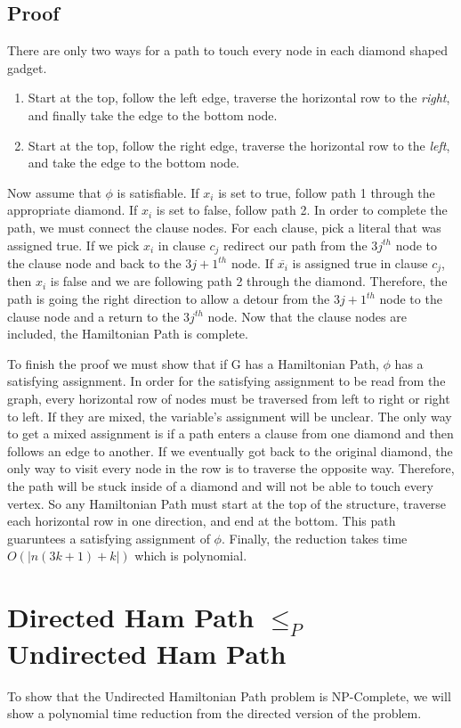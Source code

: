 \documentclass[11pt]{article}
\begin{document}
\subsection{Proof}
There are only two ways for a path to touch every node in each diamond shaped gadget. 
\begin{enumerate} 
\item {Start at the top, follow the left edge, traverse the horizontal row to
the \emph{right}, and finally take the edge to the bottom node.}
\item {Start at the top,
 follow the right edge, traverse the horizontal row to the \emph{left}, and take the 
edge to the bottom node.}
\end{enumerate}
Now assume that $\phi$ is satisfiable. If $x_{i}$ is set to true, follow path 1 through 
the appropriate diamond. If $x_{i}$ is set to false, follow path 2. In order to complete the path, we must connect the clause nodes.
For each clause, pick a literal that was assigned true. If we pick $x_{i}$ in clause
$c_{j}$ redirect our path from the $3j^{th}$ node to the clause node and back to the $3j
+1^{th}$ node. If $\overline{x_{i}}$ is assigned true in clause $c_{j}$, then $x_{i}$ is
 false and we are following path 2 through the diamond. Therefore, the path is going the
right direction to allow a detour from the $3j+1^{th}$ node to the clause node and a return to the $3j^{th}$ node. Now
 that the clause nodes are included, the Hamiltonian Path is complete.

To finish the proof we must show that if G has a Hamiltonian Path, $\phi$ has a satisfying assignment.
In order for the satisfying assignment to be read from the graph, every horizontal row
of nodes must be traversed from left to right or right to left. If they are mixed, the
variable's assignment will be unclear. The only way to get a mixed assignment is if
a path enters a clause from one diamond and then follows an edge to another. 
If we eventually got back to the original diamond, the only way to visit every node in
the row is to traverse the opposite way. Therefore, the path will be stuck inside of a 
diamond and will not be able to touch every vertex. So any Hamiltonian Path must start
at the top of the structure, traverse each horizontal row in one direction, and end
at the bottom. This path guaruntees a satisfying assignment of $\phi$. Finally, the 
reduction takes time $O(|n(3k+1) + k|)$ which is polynomial.

\section{Directed Ham Path $\leq_{P}$ Undirected Ham Path}
To show that the Undirected Hamiltonian Path problem is NP-Complete, we will show a 
polynomial time reduction from the directed version of the problem. 
\end{document}
